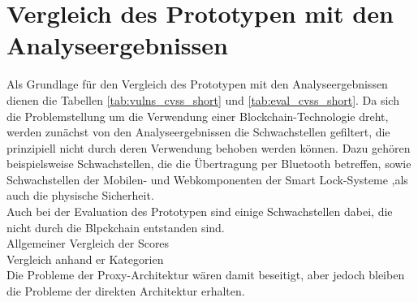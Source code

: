 \section{Vergleich des Prototypen mit den Analyseergebnissen}
\label{sec:comparison}
    Als Grundlage für den Vergleich des Prototypen mit den Analyseergebnissen dienen die Tabellen \ref{tab:vulns_cvss_short} und \ref{tab:eval_cvss_short}.
    Da sich die Problemstellung um die Verwendung einer Blockchain-Technologie dreht, werden zunächst von den Analyseergebnissen die Schwachstellen gefiltert, die prinzipiell nicht durch deren Verwendung behoben werden können. 
    Dazu gehören beispielsweise Schwachstellen, die die Übertragung per Bluetooth betreffen, sowie Schwachstellen der Mobilen- und Webkomponenten der Smart Lock-Systeme ,als auch die physische Sicherheit. 
    \medskip\\
    Auch bei der Evaluation des Prototypen sind einige Schwachstellen dabei, die nicht durch die Blpckchain entstanden sind. 
    \bigskip\\
    Allgemeiner Vergleich der Scores
    \medskip\\
    Vergleich anhand er Kategorien
    \bigskip\\
    Die Probleme der Proxy-Architektur wären damit beseitigt, aber jedoch bleiben die Probleme der direkten Architektur erhalten.
    